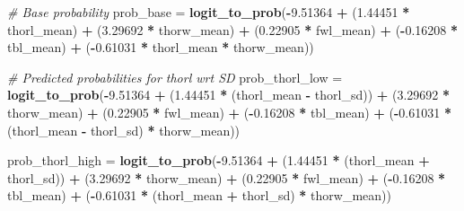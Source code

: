 \documentclass[
]{article}
\newenvironment{Shaded}{\begin{snugshade}}{\end{snugshade}}
\newcommand{\CommentTok}[1]{\textcolor[rgb]{0.56,0.35,0.01}{\textit{#1}}}
\newcommand{\FloatTok}[1]{\textcolor[rgb]{0.00,0.00,0.81}{#1}}
\newcommand{\FunctionTok}[1]{\textcolor[rgb]{0.13,0.29,0.53}{\textbf{#1}}}
\newcommand{\NormalTok}[1]{#1}
\newcommand{\OtherTok}[1]{\textcolor[rgb]{0.56,0.35,0.01}{#1}}
\newcommand{\SpecialCharTok}[1]{\textcolor[rgb]{0.81,0.36,0.00}{\textbf{#1}}}
\begin{document}
\begin{Shaded}
\begin{Highlighting}[]
\CommentTok{\# Base probability}
\NormalTok{prob\_base }\OtherTok{=} \FunctionTok{logit\_to\_prob}\NormalTok{(}\SpecialCharTok{{-}}\FloatTok{9.51364} \SpecialCharTok{+} 
\NormalTok{                            (}\FloatTok{1.44451} \SpecialCharTok{*}\NormalTok{ thorl\_mean) }\SpecialCharTok{+} 
\NormalTok{                            (}\FloatTok{3.29692} \SpecialCharTok{*}\NormalTok{ thorw\_mean) }\SpecialCharTok{+} 
\NormalTok{                            (}\FloatTok{0.22905} \SpecialCharTok{*}\NormalTok{ fwl\_mean) }\SpecialCharTok{+} 
\NormalTok{                            (}\SpecialCharTok{{-}}\FloatTok{0.16208} \SpecialCharTok{*}\NormalTok{ tbl\_mean) }\SpecialCharTok{+} 
\NormalTok{                            (}\SpecialCharTok{{-}}\FloatTok{0.61031} \SpecialCharTok{*}\NormalTok{ thorl\_mean }\SpecialCharTok{*}\NormalTok{ thorw\_mean))}

\CommentTok{\# Predicted probabilities for thorl wrt SD}
\NormalTok{prob\_thorl\_low }\OtherTok{=} \FunctionTok{logit\_to\_prob}\NormalTok{(}\SpecialCharTok{{-}}\FloatTok{9.51364} \SpecialCharTok{+} 
\NormalTok{                                (}\FloatTok{1.44451} \SpecialCharTok{*}\NormalTok{ (thorl\_mean }\SpecialCharTok{{-}}\NormalTok{ thorl\_sd)) }\SpecialCharTok{+} 
\NormalTok{                                (}\FloatTok{3.29692} \SpecialCharTok{*}\NormalTok{ thorw\_mean) }\SpecialCharTok{+} 
\NormalTok{                                (}\FloatTok{0.22905} \SpecialCharTok{*}\NormalTok{ fwl\_mean) }\SpecialCharTok{+} 
\NormalTok{                                (}\SpecialCharTok{{-}}\FloatTok{0.16208} \SpecialCharTok{*}\NormalTok{ tbl\_mean) }\SpecialCharTok{+} 
\NormalTok{                                (}\SpecialCharTok{{-}}\FloatTok{0.61031} \SpecialCharTok{*}\NormalTok{ (thorl\_mean }\SpecialCharTok{{-}}\NormalTok{ thorl\_sd) }\SpecialCharTok{*}\NormalTok{ thorw\_mean))}

\NormalTok{prob\_thorl\_high }\OtherTok{=} \FunctionTok{logit\_to\_prob}\NormalTok{(}\SpecialCharTok{{-}}\FloatTok{9.51364} \SpecialCharTok{+} 
\NormalTok{                                 (}\FloatTok{1.44451} \SpecialCharTok{*}\NormalTok{ (thorl\_mean }\SpecialCharTok{+}\NormalTok{ thorl\_sd)) }\SpecialCharTok{+} 
\NormalTok{                                 (}\FloatTok{3.29692} \SpecialCharTok{*}\NormalTok{ thorw\_mean) }\SpecialCharTok{+} 
\NormalTok{                                 (}\FloatTok{0.22905} \SpecialCharTok{*}\NormalTok{ fwl\_mean) }\SpecialCharTok{+} 
\NormalTok{                                 (}\SpecialCharTok{{-}}\FloatTok{0.16208} \SpecialCharTok{*}\NormalTok{ tbl\_mean) }\SpecialCharTok{+} 
\NormalTok{                                 (}\SpecialCharTok{{-}}\FloatTok{0.61031} \SpecialCharTok{*}\NormalTok{ (thorl\_mean }\SpecialCharTok{+}\NormalTok{ thorl\_sd) }\SpecialCharTok{*}\NormalTok{ thorw\_mean))}


\end{Highlighting}
\end{Shaded}
\end{document}
